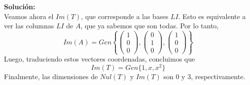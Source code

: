 \documentclass[12pt]{article}
\newenvironment{solucion}
{\begin{mdframed}[backgroundcolor=black!10]
		{\bf Solución:}\\
	}
	{
	\end{mdframed}
}
\newenvironment{preguntas}
{\begin{enumerate}\itemsep12pt
	}
	{
	\end{enumerate}
}
\begin{document}
\begin{preguntas}
\begin{solucion}
Veamos ahora el $Im (T)$, que corresponde a las bases $LI$. Esto es equivalente a ver las columnas $LI$ de $A$, que ya sabemos que son todas. Por lo tanto, 
$$Im(A) = Gen\left\{\begin{pmatrix}1 \\ 0 \\ 0 \end{pmatrix},\begin{pmatrix}0 \\ 1 \\ 0 \end{pmatrix}, \begin{pmatrix}1 \\ 0 \\ 0 \end{pmatrix}\right\}$$
Luego, traduciendo estos vectores coordenadas, concluimos que
$$Im(T) = Gen\{1, x, x^2\}$$
Finalmente, las dimensiones de $Nul(T)$ y $Im(T)$ son 0 y 3, respectivamente.
\end{solucion}
\end{preguntas}
\end{document}

